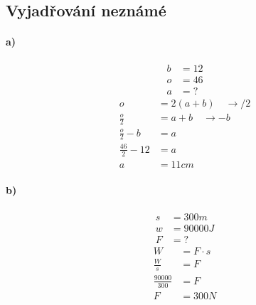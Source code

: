 \documentclass[12pt]{article}
\begin{document}
\pagebreak
\subsection{Vyjadřování neznámé}
\begin{multicols}{2}
\paragraph{a)}
\begin{equation}
\begin{split}
\nonumber
b&=12\\
o&=46\\ 
a&=?
\end{split}
\end{equation}
\begin{equation}
\begin{split}
\nonumber
o&=2(a+b) \quad \rightarrow /2\\
\frac{o}{2}&=a+b \quad \rightarrow -b\\
\frac{o}{2}-b&=a\\
\frac{46}{2}-12&=a\\
a&=11cm
\end{split}
\end{equation}

\paragraph{b)}
\begin{equation}
\begin{split}
\nonumber
s&=300m\\
w&=90 000J\\ 
F&=?
\end{split}
\end{equation}
\begin{equation}
\begin{split}
\nonumber
W&=F\cdot s\\
\frac{W}{s}&=F\\ 
\frac{90000}{300}&=F\\
F&=300N
\end{split}
\end{equation}
\end{multicols}
\end{document}
